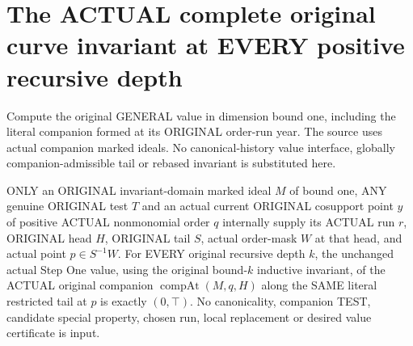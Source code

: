 \section{The ACTUAL complete original curve invariant at EVERY positive recursive depth}

Compute the original GENERAL value in dimension bound one, including the
literal companion formed at its ORIGINAL order-run year. The source
\cite[Section~5, Step~II.B]{bierstone-milman08-functoriality} uses actual
companion marked ideals. No canonical-history value interface, globally
companion-admissible tail or rebased invariant is substituted here.

\begin{theorem}
\label{hir:original-any-test-curve-actual-run-companion-leaf}
\leanok
ONLY an ORIGINAL invariant-domain marked ideal $M$ of bound one, ANY
genuine ORIGINAL test $T$ and an actual current ORIGINAL cosupport point
$y$ of positive ACTUAL nonmonomial order $q$ internally supply its ACTUAL
run $r$, ORIGINAL head $H$, ORIGINAL tail $S$, actual order-mask $W$ at
that head, and actual point $p\in S^{-1}W$. For EVERY original recursive depth $k$, the unchanged actual Step One
value, using the original bound-$k$ inductive invariant, of the ACTUAL original companion $\operatorname{compAt}(M,q,H)$
along the SAME literal restricted tail at $p$ is exactly $(0,\top)$.
No canonicality, companion TEST, candidate special property, chosen run,
local replacement or desired value certificate is input.
\end{theorem}
